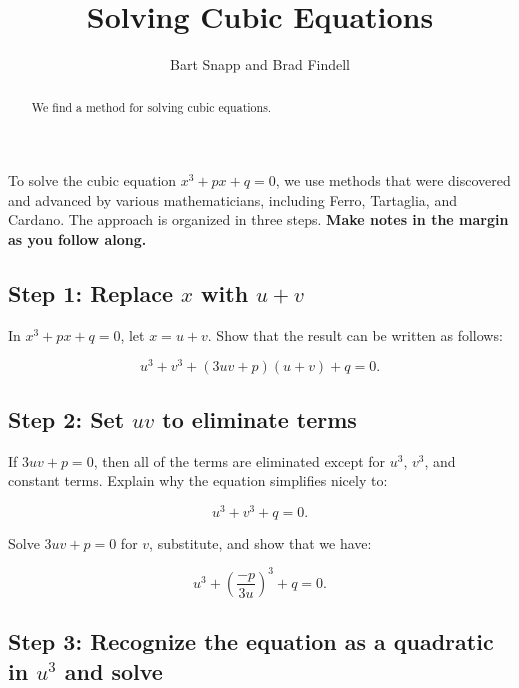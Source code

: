 \documentclass[nooutcomes]{ximera}
\title{Solving Cubic Equations}
\author{Bart Snapp and Brad Findell}
\begin{document}
\begin{abstract}
  We find a method for solving cubic equations.
\end{abstract}
\maketitle

\label{A:solvingCubics}

To solve the cubic equation $x^3+px+q=0$, we use methods that were discovered and advanced by various mathematicians, including Ferro, Tartaglia, and Cardano.  The approach is organized in three steps.  \textbf{Make notes in the margin as you follow along.}  


\subsection*{Step 1:  Replace $x$ with $u+v$}
In $x^3+px+q=0$, let $x = u + v$.  %
Show that the result can be written as follows:  

$$u^3+v^3+(3uv+p)(u+v)+q = 0.$$

\subsection*{Step 2: Set $uv$ to eliminate terms}
If $3uv+p=0$, then all of the terms are eliminated except for $u^3$, $v^3$, and constant terms. Explain why the equation simplifies nicely to:

$$u^3+v^3 + q = 0.$$

Solve $3uv+p=0$ for $v$, substitute, and show that we have:  

$$u^3+\left( \frac{-p}{3u}\right)^3+q=0.$$

\subsection*{Step 3:  Recognize the equation as a quadratic in $u^3$ and solve}
\end{document}
